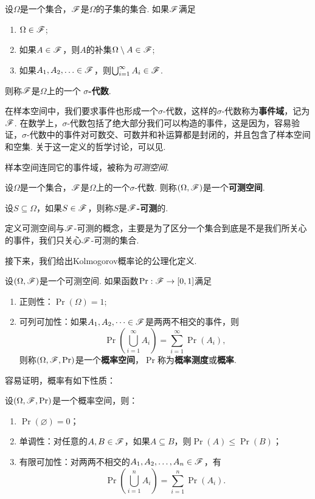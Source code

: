 \begin{definition}[$\sigma$-代数]
设$\Omega$是一个集合，$\mathscr{F}$是$\Omega$的子集的集合. 如果$\mathscr{F}$满足
\begin{enumerate}
    \item $\Omega\in\mathscr{F}$;
    \item 如果$A\in\mathscr{F}$，则$A$的补集$\Omega\setminus A\in\mathscr{F}$;
    \item 如果$A_1,A_2,\ldots\in\mathscr{F}$，则$\bigcup_{i=1}^\infty A_i\in\mathscr{F}$.
\end{enumerate}
则称$\mathscr{F}$是$\Omega$上的一个 \textbf{$\sigma$-代数}. 
\end{definition}


在样本空间中，我们要求事件也形成一个$\sigma$-代数，这样的$\sigma$-代数称为\textbf{事件域}，记为$\mathscr{F}$. 在数学上，$\sigma$-代数包括了绝大部分我们可以构造的事件，这是因为，容易验证，$\sigma$-代数中的事件对可数交、可数并和补运算都是封闭的，并且包含了样本空间和空集. 关于这一定义的哲学讨论，可以见.  

样本空间连同它的事件域，被称为\emph{可测空间}. 

\begin{definition}[可测空间] 
设$\Omega$是一个集合，$\mathscr{F}$是$\Omega$上的一个$\sigma$-代数. 则称$(\Omega,\mathscr{F})$是一个\textbf{可测空间}.

设$S\subseteq\Omega$，如果$S\in\mathscr{F}$，则称$S$是\textbf{$\mathscr{F}$-可测}的.
\end{definition}

定义可测空间与$\mathscr{F}$-可测的概念，主要是为了区分一个集合到底是不是我们所关心的事件，我们只关心$\mathscr{F}$-可测的集合.

接下来，我们给出Kolmogorov概率论的公理化定义. 

\begin{definition}
设$(\Omega,\mathscr{F})$是一个可测空间. 如果函数$\Pr:\mathscr{F}\to[0,1]$满足
\begin{enumerate}
    \item 正则性：$\Pr(\Omega)=1$;
    \item 可列可加性：如果$A_1,A_2,\dots\in\mathscr{F}$是两两不相交的事件，则
    \[
        \Pr\left(\bigcup_{i=1}^\infty A_i\right) = \sum_{i=1}^\infty \Pr(A_i),
    \]
    则称$(\Omega,\mathscr{F},\Pr)$是一个\textbf{概率空间}，$\Pr$称为\textbf{概率测度}或\textbf{概率}. 
\end{enumerate}
\end{definition}

容易证明，概率有如下性质：
\begin{proposition}
设$(\Omega,\mathscr{F},\Pr)$是一个概率空间，则：
\begin{enumerate}
    \item $\Pr(\varnothing)=0$；
    \item 单调性：对任意的$A,B\in\mathscr{F}$，如果$A\subseteq B$，则$\Pr(A)\leq\Pr(B)$；
    \item 有限可加性：对两两不相交的$A_1,A_2,\dots,A_n\in\mathscr{F}$，有
    \[
        \Pr\left(\bigcup_{i=1}^n A_i\right) = \sum_{i=1}^n \Pr(A_i).
    \]
\end{enumerate}
\end{proposition}

